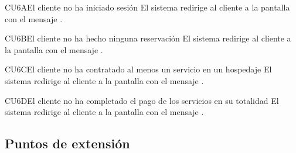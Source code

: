 \begin{UCtrayectoriaA}{CU6}{A}{El cliente no ha iniciado sesión}
	\UCpaso[] El sistema redirige al cliente a la pantalla  con el mensaje .
\end{UCtrayectoriaA}
\begin{UCtrayectoriaA}{CU6}{B}{El cliente no ha hecho ninguna reservación}
	\UCpaso[] El sistema redirige al cliente a la pantalla  con el mensaje .
\end{UCtrayectoriaA}
\begin{UCtrayectoriaA}{CU6}{C}{El cliente no ha contratado al menos un servicio en un hospedaje}
	\UCpaso[] El sistema redirige al cliente a la pantalla  con el mensaje .
\end{UCtrayectoriaA}
\begin{UCtrayectoriaA}{CU6}{D}{El cliente no ha completado el pago de los servicios en su totalidad}
	\UCpaso[] El sistema redirige al cliente a la pantalla  con el mensaje .
\end{UCtrayectoriaA}


\subsection{Puntos de extensión}
		
		
		
